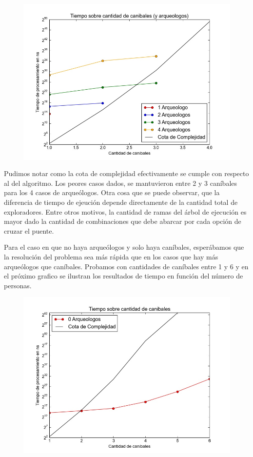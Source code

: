   \begin{figure}[H]
      \begin{center}
        \includegraphics[width=0.7\columnwidth]{imagenes/ej1exp1cotaCorregida.jpeg}
        \caption{}
      \end{center}
  \end{figure}


  Pudimos notar como la cota de complejidad efectivamente se cumple con respecto al del algoritmo. Los peores casos dados, se mantuvieron entre 2 y 3 caníbales para los 4 casos de arqueólogos. Otra cosa que se puede observar, que la diferencia de tiempo de ejeución depende directamente de la cantidad total de exploradores. Entre otros motivos, la cantidad de ramas del árbol de ejecución es mayor dado la cantidad de combinaciones que debe abarcar por cada opción de cruzar el puente.

  Para el caso en que no haya arqueólogos y solo haya caníbales, esperábamos que la resolución del problema sea más rápida que en los casos que hay más arqueólogos que caníbales. Probamos con cantidades de caníbales entre 1 y 6 y en el próximo grafico se ilustran los resultados de tiempo en función del número de personas.

  \begin{figure}[H]
      \begin{center}
        \includegraphics[width=0.7\columnwidth]{imagenes/ej1exp2cotaCorregida.jpeg}
        \caption{}
      \end{center}
  \end{figure}

